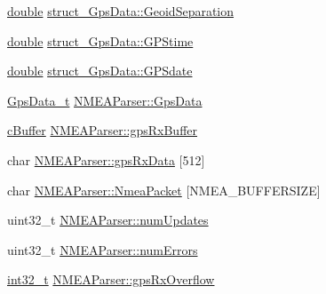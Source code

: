 \begin{DoxyCompactItemize}
\hyperlink{_super_l_u_support_8h_a8956b2b9f49bf918deed98379d159ca7}{double} \hyperlink{group___g_p_s_gadget_plugin_ga847e7e6776a9a2cdaf8c4cf0ce8e31ae}{struct\-\_\-\-Gps\-Data\-::\-Geoid\-Separation}
\item 
\hyperlink{_super_l_u_support_8h_a8956b2b9f49bf918deed98379d159ca7}{double} \hyperlink{group___g_p_s_gadget_plugin_gaeedda11a0db9fe353ca149906deccb9f}{struct\-\_\-\-Gps\-Data\-::\-G\-P\-Stime}
\item 
\hyperlink{_super_l_u_support_8h_a8956b2b9f49bf918deed98379d159ca7}{double} \hyperlink{group___g_p_s_gadget_plugin_ga5556ea2f7e4f0fb213a319e72a5961eb}{struct\-\_\-\-Gps\-Data\-::\-G\-P\-Sdate}
\item 
\hyperlink{group___g_p_s_gadget_plugin_ga4f1b5520a42a0033fb4d09fc7cbc2197}{Gps\-Data\-\_\-t} \hyperlink{group___g_p_s_gadget_plugin_ga5ed5a691ba188edd73dbfa5e6a72ee31}{N\-M\-E\-A\-Parser\-::\-Gps\-Data}
\item 
\hyperlink{group__buffer_ga63b2a19263ed371e329776b34f3164eb}{c\-Buffer} \hyperlink{group___g_p_s_gadget_plugin_gae55785b07246236cfe8d6c3139becff1}{N\-M\-E\-A\-Parser\-::gps\-Rx\-Buffer}
\item 
char \hyperlink{group___g_p_s_gadget_plugin_gaef781170a93672b3bbc887fcabdcb369}{N\-M\-E\-A\-Parser\-::gps\-Rx\-Data} \mbox{[}512\mbox{]}
\item 
char \hyperlink{group___g_p_s_gadget_plugin_ga3d1bdb9e4264f153e4537750bb8d7fd9}{N\-M\-E\-A\-Parser\-::\-Nmea\-Packet} \mbox{[}N\-M\-E\-A\-\_\-\-B\-U\-F\-F\-E\-R\-S\-I\-Z\-E\mbox{]}
\item 
uint32\-\_\-t \hyperlink{group___g_p_s_gadget_plugin_ga08ee9a94774bf6691a26d600e1ea51a9}{N\-M\-E\-A\-Parser\-::num\-Updates}
\item 
uint32\-\_\-t \hyperlink{group___g_p_s_gadget_plugin_gaef5bd2863b92f02db2ad4ef9e66e9437}{N\-M\-E\-A\-Parser\-::num\-Errors}
\item 
\hyperlink{glext_8h_a37994e3b11c72957c6f454c6ec96d43d}{int32\-\_\-t} \hyperlink{group___g_p_s_gadget_plugin_gaf0b70b48a4a5943f40dc14c11b8e0712}{N\-M\-E\-A\-Parser\-::gps\-Rx\-Overflow}
\end{DoxyCompactItemize}
